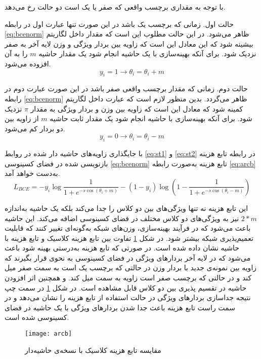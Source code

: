 با توجه به مقداری برچسب واقعی  که صفر یا یک است دو حالت رخ می‌دهد.

حالت اول. زمانی که برچسب یک باشد در این صورت تنها عبارت اول در رابطه 
\ref{eq:bcenorm}
 ظاهر می‌شود. در این حالت مطلوب این است که مقدار داخل لگاریتم بیشینه شود که این معادل این است که زاویه بین بردار ویژگی و وزن لایه آخر به صفر نزدیک شود. برای آنکه بهینه‌سازی با یک حاشیه انجام شود یک مقدار حاشیه $m$ را به آن افزوده می‌شود.
  \begin{equation}\label{eq:st1}
 	y_i=1 \to \theta_i= \theta_i + m
 \end{equation}

حالت دوم. زمانی که مقدار برچسب واقعی صفر باشد در این صورت عبارت دوم در رابطه 
\ref{eq:bcenorm}
 ظاهر می‌گردد. بدین منظور لازم است که عبارت داخل لگاریتم کمینه شود که معادل این است که زاویه بین وزن و بردار ویژگی به مقدار 
$\pi$
  نزدیک شود. برای آنکه بهینه‌سازی با حاشیه انجام شود یک مقدار ثابت حاشیه $m$ از زاویه بین دو بردار کم می‌شود.
   \begin{equation}\label{eq:st2}
 	y_i=0 \to \theta_i= \theta_i - m
 \end{equation}

با جایگذاری زاویه‌های حاشیه دار شده در روابط 
\ref{eq:st1}
 و 
 \ref{eq:st2}
 در رابطه تابع هزینه  بازنویسی شده در فضای کسینوسی 
 \ref{eq:bcenorm}
 تابع هزینه  به‌صورت رابطه
\ref{eq:arcb}
  به‌دست خواهد آمد.
\begin{equation}\label{eq:arcb}
	L_{BCE} = -y_i \log{\frac{1}{1+e^{-s\cos{(\theta_i+m)}}}} - (1-y_i)\log{(1-\frac{1}{1+e^{-s\cos{(\theta_i-m)}}} )}
\end{equation}

این تابع هزینه نه تنها ویژگی‌های بین دو کلاس را جدا می‌کند بلکه یک حاشیه به‌اندازه  
$2*m$
نیز به ویژگی‌های دو کلاس مختلف در فضای کسینوسی اضافه می‌کند. این حاشیه باعث می‌شود که در فرآیند بهینه‌سازی، وزن‌های شبکه به‌گونه‌ای تغییر کنند که قابلیت تعمیم‌پذیری شبکه بیشتر شود.
در شکل
\ref{fig:arcb}
تفاوت بین تابع هزینه کلاسیک و تابع هزینه با حاشیه نشان داده شده است. در صورتی که تابع هزینه به‌درستی بهینه شود باعث می‌شود که در لایه آخر بردارهای ویژگی در فضای کسینوسی به نحوی قرار بگیرند که زاویه بین نمونه‌ی جدید با بردار وزن در حالتی که برچسب یک است به سمت صفر میل کند و در حالتی که برچسب صفر است زاویه به سمت  میل کند. و همچنین اثر افزودن حاشیه در تقسیم پذیری بین دو کلاس قابل مشاهده است. در شکل
\ref{fig:arcb}
در سمت چپ نتیجه جداسازی بردارهای ویژگی در حالت استفاده از تابع هزینه  را نشان می‌دهد و در سمت راست تابع هزینه  باعث جدا شدن بردارهای ویژگی با یک حاشیه در فضای کسینوسی شده است. 
\begin{figure}[h]
	\centerline{\texttt{[image: arcb]}}
	\caption{مقایسه تابع هزینه
		کلاسیک با نسخه‌ی حاشیه‌دار
	 }
	\label{fig:arcb}
\end{figure}

